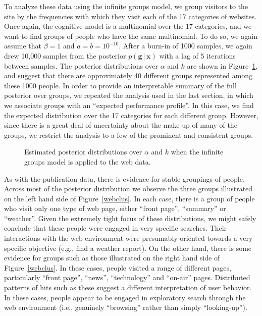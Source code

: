 \documentclass[authoryear]{elsarticle}
\newcommand{\condon}{\,|\,}
\newcommand{\vctr}[1]{\bm{#1}}
\newcommand{\bfc}{}
\newcommand{\efc}{\vspace*{15pt}}
\newcommand{\fcs}{}
\begin{document}
To analyze these data using the infinite groups model, we group visitors to the site by
the frequencies with which they visit each of the 17 categories of websites. Once again,
the cognitive model is a multinomial over the 17 categories, and we want to find
groups of people who have the same multinomial. To do so, we again assume that
$\beta=1$ and $a=b=10^{-10}$. After a burn-in of 1000 samples, we again drew
10,000 samples from the posterior $p(\vctr{g} \condon \vctr{x})$ with a lag of 5
iterations between samples. The posterior distributions over $\alpha$ and $k$ are
shown in Figure~\ref{webdata}, and suggest that there are approximately 40 different
groups represented among these 1000 people. In order to provide an interpretable summary
of the full posterior over groups, we repeated the analysis used in the last section, in
which we associate groups with an ``expected performance profile''. In this case, we find
the expected distribution over the 17 categories for each different group. However, since
there is a great deal of uncertainty about the make-up of many of the groups, we
restrict the analysis to a few of the prominent and consistent groups.

\begin{figure}[t]
\begin{center}
\caption{\bfc Estimated posterior distributions \fcs over $\alpha$ and $k$ when the
infinite groups model is applied to the web data.\efc}
\label{webdata}
\end{center}
\end{figure}

As with the publication data, there is evidence for stable groupings of people. Across most
of the posterior distribution we observe the three groups illustrated on the left hand side
of Figure~\ref{webclus}. In each case, there is a group of people who visit only one type
of web page, either ``front page'', ``summary'' or ``weather''. Given the extremely tight
focus of these distributions, we might safely conclude that these people were engaged in
very specific searches. Their interactions with the web environment were presumably oriented
towards a very specific objective (e.g., find a weather report). On the other hand, there is some
evidence for groups such as those illustrated on the right hand side of Figure~\ref{webclus}.
In these cases, people visited a range of different pages, particularly ``front page'', ``news'',
``technology'' and ``on-air'' pages. Distributed patterns of hits such as these suggest a
different interpretation of user behavior. In these cases, people appear to be engaged in
exploratory search through the web environment (i.e., genuinely ``browsing'' rather than simply
``looking-up'').
\end{document}
